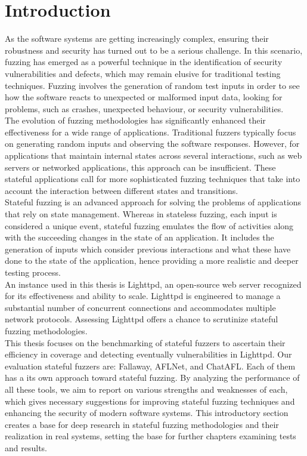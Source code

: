 \chapter{Introduction}

As the software systems are getting increasingly complex, ensuring their robustness and security has turned out to be a serious challenge. In this scenario, fuzzing has emerged as a powerful technique in the identification of security vulnerabilities and defects, which may remain elusive for traditional testing techniques. Fuzzing involves the generation of random test inputs in order to see how the software reacts to unexpected or malformed input data, looking for problems, such as crashes, unexpected behaviour, or security vulnerabilities.
\\The evolution of fuzzing methodologies has significantly enhanced their effectiveness for a wide range of applications. Traditional fuzzers typically focus on generating random inputs and observing the software responses. However, for applications that maintain internal states across several interactions, such as web servers or networked applications, this approach can be insufficient. These stateful applications call for more sophisticated fuzzing techniques that take into account the interaction between different states and transitions.
\\Stateful fuzzing is an advanced approach for solving the problems of applications that rely on state management. Whereas in stateless fuzzing, each input is considered a unique event, stateful fuzzing emulates the flow of activities along with the succeeding changes in the state of an application. It includes the generation of inputs which consider previous interactions and what these have done to the state of the application, hence providing a more realistic and deeper testing process.
\\An instance used in this thesis is Lighttpd, an open-source web server recognized for its effectiveness and ability to scale. Lighttpd is engineered to manage a substantial number of concurrent connections and accommodates multiple network protocols. Assessing Lighttpd offers a chance to scrutinize stateful fuzzing methodologies.
\\This thesis focuses on the benchmarking of stateful fuzzers to ascertain their efficiency in coverage and detecting eventually vulnerabilities in Lighttpd. Our evaluation stateful fuzzers are: Fallaway, AFLNet, and ChatAFL. Each of them has a its own approach toward stateful fuzzing.
By analyzing the performance of all these tools, we aim to report on various strengths and weaknesses of each, which gives necessary suggestions for improving stateful fuzzing techniques and enhancing the security of modern software systems. This introductory section creates a base for deep research in stateful fuzzing methodologies and their realization in real systems, setting the base for further chapters examining tests and results.